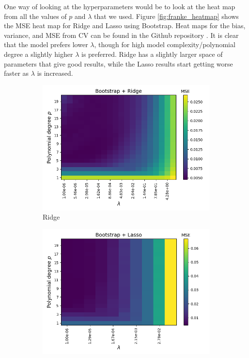 \documentclass[a4paper]{article}
\begin{document}
One way of looking at the hyperparameters would be to look at the heat map from all the values of $p$ and $\lambda$ that we used. Figure \ref{fig:franke_heatmap} shows the MSE heat map for Ridge and Lasso using Bootstrap. Heat maps for the bias, variance, and MSE from CV can be found in the Github repository \cite{Github1}. It is clear that the model prefers lower $\lambda$, though for high model complexity/polynomial degree a slightly higher $\lambda$ is preferred. Ridge has a slightly larger space of parameters that give good results, while the Lasso results start getting worse faster as $\lambda$ is increased.%
\begin{figure}[H]
  \centering
  \begin{subfigure}{0.49\textwidth}
    \includegraphics[scale=0.45]{../figures/task_d/heatmap_bs_error_N529_pmax20_nlamb20_noise0.05_seed4155_Ridge_boot_Nbs264.png}
    \caption{Ridge}
  \end{subfigure}
  \begin{subfigure}{0.49\textwidth}
    \includegraphics[scale=0.45]{../figures/task_e/heatmap_bs_error_N529_pmax20_nlamb10_noise0.05_seed4155_Lasso_boot_Nbs264.png}

\end{subfigure}
\end{figure}
\end{document}
